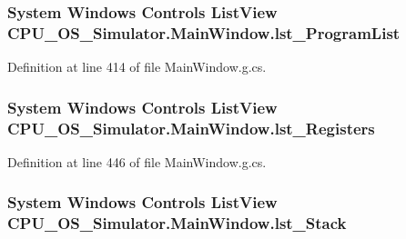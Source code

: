 \subsubsection[{lst\+\_\+\+Program\+List}]{\setlength{\rightskip}{0pt plus 5cm}System Windows Controls List\+View C\+P\+U\+\_\+\+O\+S\+\_\+\+Simulator.\+Main\+Window.\+lst\+\_\+\+Program\+List\hspace{0.3cm}{\ttfamily [package]}}\label{class_c_p_u___o_s___simulator_1_1_main_window_ab33f21e0f19eab104e6f67f44d89daeb}


Definition at line 414 of file Main\+Window.\+g.\+cs.

\hypertarget{class_c_p_u___o_s___simulator_1_1_main_window_ae88013c536662328670f206a4cab99b1}{}
\subsubsection[{lst\+\_\+\+Registers}]{\setlength{\rightskip}{0pt plus 5cm}System Windows Controls List\+View C\+P\+U\+\_\+\+O\+S\+\_\+\+Simulator.\+Main\+Window.\+lst\+\_\+\+Registers\hspace{0.3cm}{\ttfamily [package]}}\label{class_c_p_u___o_s___simulator_1_1_main_window_ae88013c536662328670f206a4cab99b1}


Definition at line 446 of file Main\+Window.\+g.\+cs.

\hypertarget{class_c_p_u___o_s___simulator_1_1_main_window_a8453db331c7cc1e7c1e711a06b2ec30c}{}
\subsubsection[{lst\+\_\+\+Stack}]{\setlength{\rightskip}{0pt plus 5cm}System Windows Controls List\+View C\+P\+U\+\_\+\+O\+S\+\_\+\+Simulator.\+Main\+Window.\+lst\+\_\+\+Stack\hspace{0.3cm}{\ttfamily [package]}}\label{class_c_p_u___o_s___simulator_1_1_main_window_a8453db331c7cc1e7c1e711a06b2ec30c}


